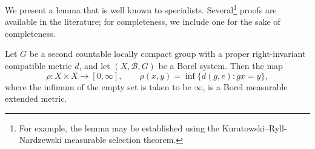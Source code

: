\documentclass[11pt]{article}
\theoremstyle{plain}
\theoremstyle{definition}
\numberwithin{figure}{section}
\begin{document}
We present a lemma that is well known to specialists. Several\footnote{For example, the lemma may be established using the Kuratowski–Ryll-Nardzewski measurable selection theorem.} proofs are available in the literature; for completeness, we include one for the sake of completeness.

\begin{lemma}\label{lem:rho_is_Borel}
Let $G$ be a second countable locally compact group with a proper
right-invariant compatible metric $d$, and let $(X,\mathcal{B}, G)$ be a Borel system. Then the map
\[
\rho:X\times X\to [0,\infty],\qquad 
\rho(x,y)=\inf\{d(g,e): gx=y\},
\]
where the infimum of the empty set is taken to be $\infty$, is a  Borel measurable extended metric. 

\end{lemma}
\end{document}
